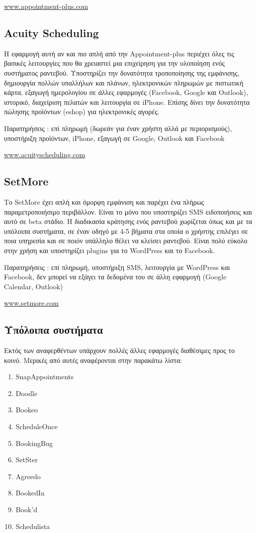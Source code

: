\href{http://www.appointment-plus.com/}{www.appointment-plus.com}

\subsection{Acuity Scheduling}
Η εφαρμογή αυτή αν και πιο απλή από την Appointment-plus περιέχει όλες τις βασικές λειτουργίες που θα χρειαστεί μια επιχείρηση για την υλοποίηση ενός συστήματος ραντεβού. Υποστηρίζει την δυνατότητα τροποποίησης της εμφάνισης, δημιουργία πολλών υπαλλήλων και πλάνων, ηλεκτρονικών πληρωμών με πιστωτική κάρτα, εξαγωγή ημερολογίου σε άλλες εφαρμογές (Facebook, Google και Outlook), ιστορικό, διαχείριση πελατών και λειτουργία σε iPhone. Επίσης δίνει την δυνατότητα πώλησης προϊόντων (eshop) για ηλεκτρονικές αγορές.

Παρατηρήσεις : επί πληρωμή (δωρεάν για έναν χρήστη αλλά με περιορισμούς), υποστήριξη προϊόντων, iPhone, εξαγωγή σε Google, Outlook και Facebook

\href{http://www.acuityscheduling.com/}{www.acuityscheduling.com}

\subsection{SetMore}
Το SetMore έχει απλή και όμορφη εμφάνιση και παρέχει ένα πλήρως παραμετροποιήσιμο περιβάλλον. Είναι το μόνο που υποστηρίζει SMS ειδοποιήσεις και αυτό σε beta στάδιο. Η διαδικασία κράτησης ενός ραντεβού χωρίζεται όπως και με τα υπόλοιπα συστήματα, σε έναν οδηγό με 4-5 βήματα στα οποία ο χρήστης επιλέγει σε ποια υπηρεσία και σε ποιόν υπάλληλο θέλει να κλείσει ραντεβού. Είναι πολύ εύκολο στην χρήση και υποστηρίζει plugins για το WordPress και το Facebook.

Παρατηρήσεις : επί πληρωμή, υποστήριξη SMS, λειτουργία με WordPress και Facebook, δεν μπορεί να εξάγει τα δεδομένα του σε άλλη εφαρμογή (Google Calendar, Outlook)

\href{http://www.setmore.com/}{www.setmore.com}

\subsection{Υπόλοιπα συστήματα}
Εκτός των αναφερθέντων υπάρχουν πολλές άλλες εφαρμογές διαθέσιμες προς το κοινό. Μερικές από αυτές αναφέρονται στην παρακάτω λίστα:
\begin{enumerate}
\item SnapAppointments
\item Doodle
\item Bookeo
\item ScheduleOnce
\item BookingBug
\item SetSter
\item Agreedo
\item BookedIn
\item Book'd
\item Schedulista
\end{enumerate}

